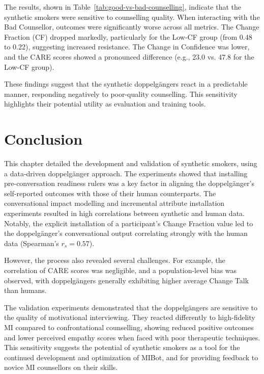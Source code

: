The results, shown in Table~\ref{tab:good-vs-bad-counselling}, indicate that the synthetic smokers were sensitive to counselling quality. When interacting with the Bad Counsellor, outcomes were significantly worse across all metrics. The Change Fraction (CF) dropped markedly, particularly for the Low-CF group (from 0.48 to 0.22), suggesting increased resistance. The Change in Confidence was lower, and the CARE scores showed a pronounced difference (e.g., 23.0 vs. 47.8 for the Low-CF group).

These findings suggest that the synthetic doppelgängers react in a predictable manner, responding negatively to poor-quality counselling. This sensitivity highlights their potential utility as evaluation and training tools.

\section{Conclusion}

This chapter detailed the development and validation of synthetic smokers, using a data-driven doppelgänger approach. The experiments showed that installing pre-conversation readiness rulers was a key factor in aligning the doppelgänger’s self-reported outcomes with those of their human counterparts. The conversational impact modelling and incremental attribute installation experiments resulted in high correlations between synthetic and human data. Notably, the explicit installation of a participant's Change Fraction value led to the doppelgänger's conversational output correlating strongly with the human data (Spearman’s $r_s = 0.57$).

However, the process also revealed several challenges. For example, the correlation of CARE scores was negligible, and a population-level bias was observed, with doppelgängers generally exhibiting higher average Change Talk than humans.

The validation experiments demonstrated that the doppelgängers are sensitive to the quality of motivational interviewing. They reacted differently to high-fidelity MI compared to confrontational counselling, showing reduced positive outcomes and lower perceived empathy scores when faced with poor therapeutic techniques. This sensitivity suggests the potential of synthetic smokers as a tool for the continued development and optimization of MIBot, and for providing feedback to novice MI counsellors on their skills.